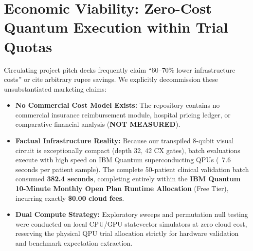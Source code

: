 \documentclass[11pt,a4paper]{report}
\newcommand{\notmeasured}{\textcolor{csred}{\textbf{NOT MEASURED}}}
\begin{document}
\section{Economic Viability: Zero-Cost Quantum Execution within Trial Quotas}
Circulating project pitch decks frequently claim ``60--70\% lower infrastructure costs'' or cite arbitrary rupee savings. We explicitly decommission these unsubstantiated marketing claims:
\begin{itemize}
  \item \textbf{No Commercial Cost Model Exists:} The repository contains no commercial insurance reimbursement module, hospital pricing ledger, or comparative financial analysis (\notmeasured).
  \item \textbf{Factual Infrastructure Reality:} Because our transpiled 8-qubit visual circuit is exceptionally compact (depth 32, 42 CX gates), batch evaluations execute with high speed on IBM Quantum superconducting QPUs (~7.6 seconds per patient sample). The complete 50-patient clinical validation batch consumed \textbf{382.4 seconds}, completing entirely within the \textbf{IBM Quantum 10-Minute Monthly Open Plan Runtime Allocation} (Free Tier), incurring exactly \textbf{\$0.00 cloud fees}.
  \item \textbf{Dual Compute Strategy:} Exploratory sweeps and permutation null testing were conducted on local CPU/GPU statevector simulators at zero cloud cost, reserving the physical QPU trial allocation strictly for hardware validation and benchmark expectation extraction.
\end{itemize}
\end{document}
